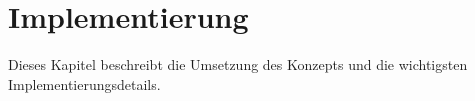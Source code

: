 \chapter{Implementierung}

Dieses Kapitel beschreibt die Umsetzung des Konzepts und die wichtigsten Implementierungsdetails.
